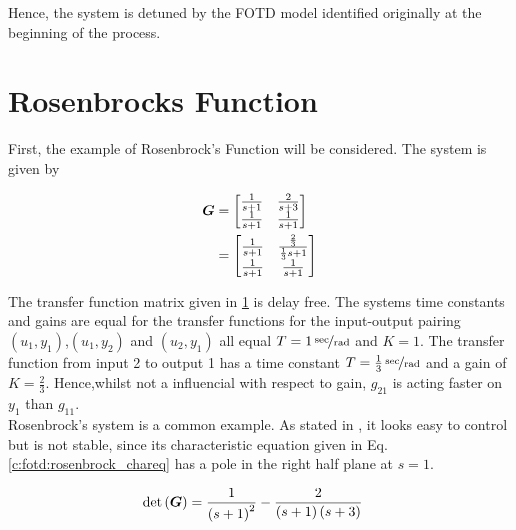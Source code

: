 Hence, the system is detuned by the FOTD model identified originally at the beginning of the process.

\newpage
\section{Rosenbrocks Function}%
\label{c:fotd:s:rosenbrook}

First, the example of Rosenbrock's Function will be considered. The system is given by

\begin{align}
\begin{split}
\mbox{\boldmath$G$} &= \begin{bmatrix}
\frac{1}{s+1} & \frac{2}{s+3} \\
\frac{1}{s+1} & \frac{1}{s+1}
\end{bmatrix}
\\
&=\begin{bmatrix}
\frac{1}{s+1} & \frac{\frac{2}{3}}{\frac{1}{3}s+1} \\
\frac{1}{s+1} & \frac{1}{s+1}
\end{bmatrix} 
\end{split}
\label{c:fotd:e:rosenbrock_sys}
\end{align}

The transfer function matrix given in \ref{c:fotd:s:rosenbrook} is delay free. The systems time constants and gains are equal for the transfer functions for the input-output pairing  $(u_1, y_1)$,$(u_1,y_2)$ and $(u_2,y_1)$ all equal $T = \unitfrac[1]{sec}{rad}$ and $K = 1$. The transfer function from input 2 to output 1 has a time constant $T = \unitfrac[\frac{1}{3}]{sec}{rad}$ and a gain of $K = \frac{2}{3}$. Hence,whilst not a influencial with respect to gain, $g_{21}$ is acting faster on $y_1$ than $g_{11}$.\\ 

Rosenbrock's system is a common example. As stated in \cite{Astrom2001a}, it looks easy to control but is not stable, since its characteristic equation given in Eq. \ref{c:fotd:rosenbrock_chareq} has a pole in the right half plane at $s=1$.

\begin{align}
\begin{split}
\det\left( \mbox{\boldmath$G$} \right) &= \frac{1}{\left( s + 1\right)^2} - \frac{2}{\left( s + 1\right) \left( s + 3\right)}
\end{split}
\label{c:fotd:rosenbrock_chareq}
\end{align}

